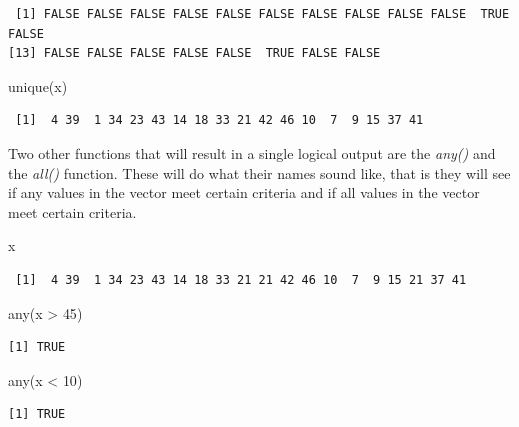 \documentclass[
  letterpaper,
  DIV=11,
  numbers=noendperiod]{scrreprt}
\newenvironment{Shaded}{\begin{snugshade}}{\end{snugshade}}
\newcommand{\DecValTok}[1]{\textcolor[rgb]{0.68,0.00,0.00}{#1}}
\newcommand{\FunctionTok}[1]{\textcolor[rgb]{0.28,0.35,0.67}{#1}}
\newcommand{\NormalTok}[1]{\textcolor[rgb]{0.00,0.23,0.31}{#1}}
\newcommand{\SpecialCharTok}[1]{\textcolor[rgb]{0.37,0.37,0.37}{#1}}
\begin{document}
\begin{verbatim}
 [1] FALSE FALSE FALSE FALSE FALSE FALSE FALSE FALSE FALSE FALSE  TRUE FALSE
[13] FALSE FALSE FALSE FALSE FALSE  TRUE FALSE FALSE
\end{verbatim}

\begin{Shaded}
\begin{Highlighting}[]
\FunctionTok{unique}\NormalTok{(x)}
\end{Highlighting}
\end{Shaded}

\begin{verbatim}
 [1]  4 39  1 34 23 43 14 18 33 21 42 46 10  7  9 15 37 41
\end{verbatim}

Two other functions that will result in a single logical output are the
\emph{any()} and the \emph{all()} function. These will do what their
names sound like, that is they will see if any values in the vector meet
certain criteria and if all values in the vector meet certain criteria.

\begin{Shaded}
\begin{Highlighting}[]
\NormalTok{x}
\end{Highlighting}
\end{Shaded}

\begin{verbatim}
 [1]  4 39  1 34 23 43 14 18 33 21 21 42 46 10  7  9 15 21 37 41
\end{verbatim}

\begin{Shaded}
\begin{Highlighting}[]
\FunctionTok{any}\NormalTok{(x }\SpecialCharTok{\textgreater{}} \DecValTok{45}\NormalTok{)}
\end{Highlighting}
\end{Shaded}

\begin{verbatim}
[1] TRUE
\end{verbatim}

\begin{Shaded}
\begin{Highlighting}[]
\FunctionTok{any}\NormalTok{(x }\SpecialCharTok{\textless{}} \DecValTok{10}\NormalTok{)}
\end{Highlighting}
\end{Shaded}

\begin{verbatim}
[1] TRUE
\end{verbatim}
\end{document}
